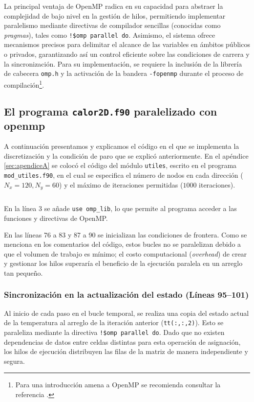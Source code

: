 \documentclass[12pt,twocolumn]{article}
\begin{document}
La principal ventaja de OpenMP radica en su capacidad para abstraer la complejidad de bajo nivel en la gestión de hilos, permitiendo implementar paralelismo mediante directivas de compilador sencillas (conocidas como \textit{pragmas}), tales como \texttt{!\$omp parallel do}. Asimismo, el sistema ofrece mecanismos precisos para delimitar el alcance de las variables en ámbitos públicos o privados, garantizando así un control eficiente sobre las condiciones de carrera y la sincronización. Para su implementación, se requiere la inclusión de la librería de cabecera \texttt{omp.h} y la activación de la bandera \texttt{-fopenmp} durante el proceso de compilación\footnote{%
Para una introducción amena a OpenMP se recomienda consultar la referencia \cite{ltoma_openmp}.
}.




\subsection[%
El programa \texorpdfstring{\texttt{calor2D.f90}}{calor2D.f90}
]{%
El programa \texorpdfstring{\texttt{calor2D.f90}}{calor2D.f90} paralelizado con openmp
}
A continuación presentamos y explicamos el código en el que se implementa la discretización y la condición de paro que se explicó anteriormente. En el apéndice \ref{sec:apendiceA} se colocó el código del módulo \texttt{utiles}, escrito en el programa \texttt{mod\_utiles.f90}, en el cual se especifica el número de nodos en cada dirección ($N_x=120,N_y=60$) y el máximo de iteraciones permitidas ($1000$ iteraciones).

\inputminted{fortran}{calor2D_paralelo.f90}
En la línea 3 se añade \texttt{use omp\_lib}, lo que permite al programa acceder a las funciones y directivas de OpenMP.

En las líneas 76 a 83 y 87 a 90 se inicializan las condiciones de frontera. Como se menciona en los comentarios del código, estos bucles no se paralelizan debido a que el volumen de trabajo es mínimo; el costo computacional (\emph{overhead}) de crear y gestionar los hilos superaría el beneficio de la ejecución paralela en un arreglo tan pequeño.

\subsubsection*{Sincronización en la actualización del estado (Líneas 95--101)}

Al inicio de cada paso en el bucle temporal, se realiza una copia del estado actual de la temperatura al arreglo de la iteración anterior (\texttt{tt(:,:,2)}). Esto se paraleliza mediante la directiva \texttt{!\$omp parallel do}. Dado que no existen dependencias de datos entre celdas distintas para esta operación de asignación, los hilos de ejecución distribuyen las filas de la matriz de manera independiente y segura.
\end{document}
